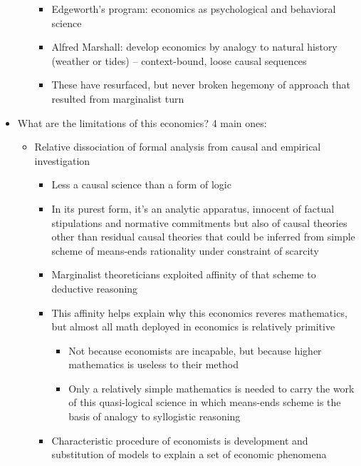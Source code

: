 \begin{itemize}
\begin{itemize}
    \begin{itemize}
    \tightlist
    \item
      Edgeworth's program: economics as psychological and behavioral
      science
    \item
      Alfred Marshall: develop economics by analogy to natural history
      (weather or tides) -- context-bound, loose causal sequences
    \item
      These have resurfaced, but never broken hegemony of approach that
      resulted from marginalist turn
    \end{itemize}
  \end{itemize}
\item
  What are the limitations of this economics? 4 main ones:

  \begin{itemize}
  \tightlist
  \item
    Relative dissociation of formal analysis from causal and empirical
    investigation

    \begin{itemize}
    \tightlist
    \item
      Less a causal science than a form of logic
    \item
      In its purest form, it's an analytic apparatus, innocent of
      factual stipulations and normative commitments but also of causal
      theories other than residual causal theories that could be
      inferred from simple scheme of means-ends rationality under
      constraint of scarcity
    \item
      Marginalist theoreticians exploited affinity of that scheme to
      deductive reasoning
    \item
      This affinity helps explain why this economics reveres
      mathematics, but almost all math deployed in economics is
      relatively primitive

      \begin{itemize}
      \tightlist
      \item
        Not because economists are incapable, but because higher
        mathematics is useless to their method
      \item
        Only a relatively simple mathematics is needed to carry the work
        of this quasi-logical science in which means-ends scheme is the
        basis of analogy to syllogistic reasoning
      \end{itemize}
    \item
      Characteristic procedure of economists is development and
      substitution of models to explain a set of economic phenomena


\end{itemize}
\end{itemize}
\end{itemize}
